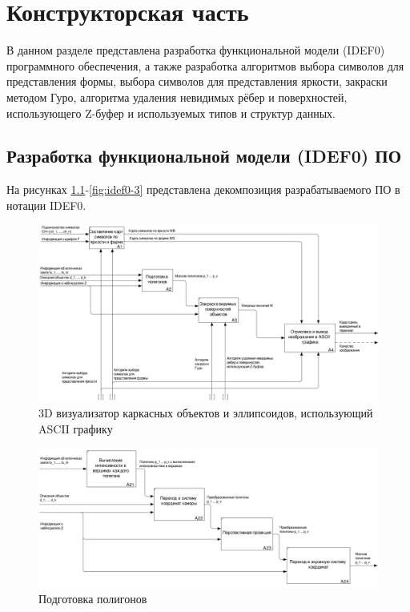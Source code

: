 \chapter{Конструкторская часть}

В данном разделе представлена разработка функциональной модели (IDEF0) программного обеспечения, а также разработка алгоритмов выбора символов для представления формы, выбора символов для представления яркости, закраски методом Гуро, алгоритма удаления невидимых рёбер и поверхностей, использующего Z-буфер и используемых типов и структур данных.

\section{Разработка функциональной модели (IDEF0) ПО}

На рисунках \ref{fig:idef0-1}-\ref{fig:idef0-3} представлена декомпозиция разрабатываемого ПО в нотации IDEF0.

\begin{figure}[H]
    \centering
    \includegraphics[scale=0.2]{images/02_A0.png}
    \caption{3D визуализатор каркасных объектов и эллипсоидов, использующий ASCII графику}
    \label{fig:idef0-1}
\end{figure}

\begin{figure}[H]
    \centering
    \includegraphics[scale=0.2]{images/03_A2.png}
    \caption{Подготовка полигонов}
    \label{fig:idef0-2}
\end{figure}

